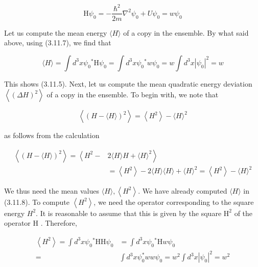\documentclass{article}
\begin{document}
\begin{equation*}
\mathrm{H} \psi_{0}=-\frac{\hbar^{2}}{2 m} \nabla^{2} \psi_{0}+U \psi_{0}=w \psi_{0} \tag{3.11.7}
\end{equation*}
 

Let us compute the mean energy $\langle H\rangle$ of a copy in the ensemble. By what said above, using (3.11.7), we find that
 
\begin{equation*}
\langle H\rangle=\int d^{3} x \psi_{0}{ }^{*} \mathrm{H} \psi_{0}=\int d^{3} x \psi_{0}{ }^{*} w \psi_{0}=w \int d^{3} x\left|\psi_{0}\right|^{2}=w \tag{3.11.8}
\end{equation*}
 

This shows (3.11.5).
Next, let us compute the mean quadratic energy deviation $\left\langle(\Delta H)^{2}\right\rangle$ of a copy in the ensemble. To begin with, we note that
 
\begin{equation*}
\left\langle(H-\langle H\rangle)^{2}\right\rangle=\left\langle H^{2}\right\rangle-\langle H\rangle^{2} \tag{3.11.9}
\end{equation*}
 
as follows from the calculation
 
\begin{align*}
\left\langle(H-\langle H\rangle)^{2}\right\rangle=\left\langle H^{2}-\right. & \left.2\langle H\rangle H+\langle H\rangle^{2}\right\rangle  \tag{3.11.10}\\
& =\left\langle H^{2}\right\rangle-2\langle H\rangle\langle H\rangle+\langle H\rangle^{2}=\left\langle H^{2}\right\rangle-\langle H\rangle^{2}
\end{align*}
 

We thus need the mean values $\langle H\rangle,\left\langle H^{2}\right\rangle$. We have already computed $\langle H\rangle$ in (3.11.8). To compute $\left\langle H^{2}\right\rangle$, we need the operator corresponding to the square energy $H^{2}$. It is reasonable to assume that this is given by the square $\mathrm{H}^{2}$ of the operator H . Therefore,
 
\begin{align*}
\left\langle H^{2}\right\rangle=\int d^{3} x \psi_{0}{ }^{*} \mathrm{HH} \psi_{0} & =\int d^{3} x \psi_{0}{ }^{*} \mathrm{H} w \psi_{0}  \tag{3.11.11}\\
= & \int d^{3} x \psi_{0}^{*} w w \psi_{0}=w^{2} \int d^{3} x\left|\psi_{0}\right|^{2}=w^{2}
\end{align*}
 
\end{document}
